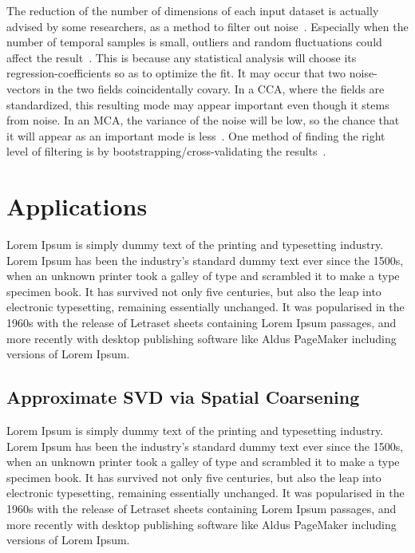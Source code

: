 \documentclass{acm_proc_article-sp}
\begin{document}
The reduction of the number of dimensions of each input dataset is actually advised by some researchers, as a method to filter out noise~\cite{Barnett1987}. Especially when the number of temporal samples is small, outliers and random fluctuations could affect the result~\cite{Bretherton1992}. This is because any statistical analysis will choose its regression-coefficients so as to optimize the fit. It may occur that two noise-vectors in the two fields coincidentally covary. In a CCA, where the fields are standardized, this resulting mode may appear important even though it stems from noise. In an MCA, the variance of the noise will be low, so the chance that it will appear as an important mode is less~\cite{Bretherton1992}. One method of finding the right level of filtering is by bootstrapping/cross-validating the results~\cite{Livezey1999}.


\section{Applications}
\label{Applications}

Lorem Ipsum is simply dummy text of the printing and typesetting industry. Lorem Ipsum has been the industry's standard dummy text ever since the 1500s, when an unknown printer took a galley of type and scrambled it to make a type specimen book. It has survived not only five centuries, but also the leap into electronic typesetting, remaining essentially unchanged. It was popularised in the 1960s with the release of Letraset sheets containing Lorem Ipsum passages, and more recently with desktop publishing software like Aldus PageMaker including versions of Lorem Ipsum.

\subsection{Approximate SVD via Spatial Coarsening}
\label{sec:Applications Approximate SVD via Spatial Coarsening}

Lorem Ipsum is simply dummy text of the printing and typesetting industry. Lorem Ipsum has been the industry's standard dummy text ever since the 1500s, when an unknown printer took a galley of type and scrambled it to make a type specimen book. It has survived not only five centuries, but also the leap into electronic typesetting, remaining essentially unchanged. It was popularised in the 1960s with the release of Letraset sheets containing Lorem Ipsum passages, and more recently with desktop publishing software like Aldus PageMaker including versions of Lorem Ipsum.
\end{document}
